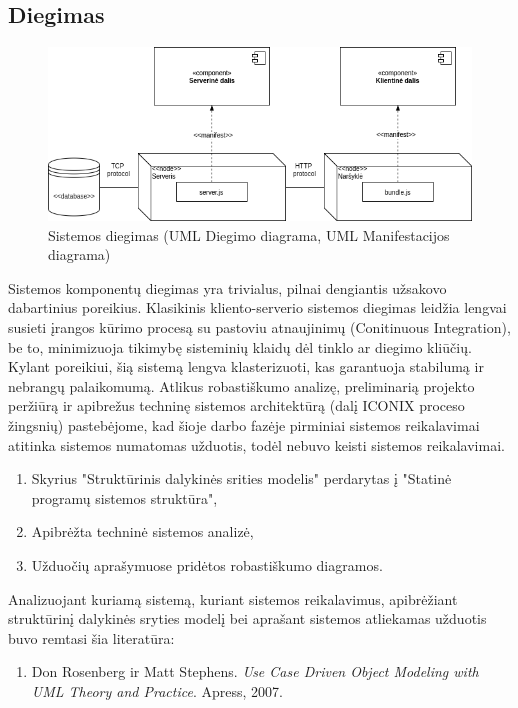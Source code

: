 \documentclass{VUMIFPSkursinis}
\begin{document}
      \subsection{Diegimas}
        \begin{figure}[H]
          \centering
          \includegraphics[scale=0.7]{img/Diegimas}
          \caption{Sistemos diegimas (UML Diegimo diagrama, UML Manifestacijos diagrama)}
          \label{deployment}
        \end{figure}
        Sistemos komponentų diegimas yra trivialus, pilnai dengiantis užsakovo dabartinius poreikius. Klasikinis kliento-serverio sistemos diegimas leidžia lengvai susieti įrangos kūrimo procesą su pastoviu atnaujinimų (Conitinuous Integration), be to, minimizuoja tikimybę sisteminių klaidų dėl tinklo ar diegimo kliūčių. Kylant poreikiui, šią sistemą lengva klasterizuoti, kas garantuoja stabilumą ir nebrangų palaikomumą.
			Atlikus robastiškumo analizę, preliminarią projekto peržiūrą ir apibrežus techninę sistemos architektūrą (dalį ICONIX proceso žingsnių) pastebėjome, kad šioje darbo fazėje pirminiai sistemos reikalavimai atitinka sistemos numatomas užduotis, todėl nebuvo keisti sistemos reikalavimai.
			\begin{enumerate}
				\item Skyrius "Struktūrinis dalykinės srities modelis" perdarytas į "Statinė programų sistemos struktūra",
				\item Apibrėžta techninė sistemos analizė,
				\item Užduočių aprašymuose pridėtos robastiškumo diagramos.
			\end{enumerate}
        Analizuojant kuriamą sistemą, kuriant sistemos reikalavimus, apibrėžiant struktūrinį dalykinės sryties modelį bei aprašant sistemos atliekamas užduotis buvo remtasi šia literatūra:
            \begin{enumerate}
                \item Don Rosenberg ir Matt Stephens. \textit{Use Case Driven Object Modeling with UML Theory and Practice}. Apress, 2007.
            \end{enumerate}
      
    
\end{document}
